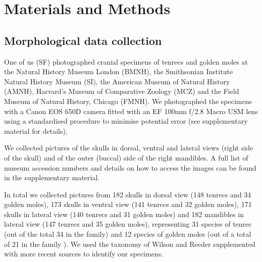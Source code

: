 \documentclass[12pt,a4paper]{article}
\begin{document}
\section{Materials and Methods}

\subsection{Morphological data collection} 

	
	One of us (SF) photographed cranial specimens of tenrecs and golden moles at the Natural History Museum London (BMNH), the Smithsonian Institute Natural History Museum (SI), the American Museum of Natural History (AMNH), Harvard's Museum of Comparative Zoology (MCZ) and the Field Museum of Natural History, Chicago (FMNH). We photographed the specimens with a Canon EOS 650D camera fitted with an EF 100mm f/2.8 Macro USM lens using a standardised procedure to minimise potential error (see supplementary material for details). 

	We collected pictures of the skulls in dorsal, ventral and lateral views (right side of the skull) and of the outer (buccal) side of the right mandibles. A full list of museum accession numbers and details on how to access the images can be found in the supplementary material.
	

	In total we collected pictures from 182 skulls in dorsal view (148 tenrecs and 34 golden moles), 173 skulls in ventral view (141 tenrecs and 32 golden moles), 171 skulls in lateral view (140 tenrecs and 31 golden moles) and 182 mandibles in lateral view (147 tenrecs and 35 golden moles), representing 31 species of tenrec (out of the total 34 in the family) and 12 species of golden moles (out of a total of 21 in the family \citep{Asher2010}). We used the taxonomy of Wilson and Reeder \citeyearpar{Wilson2005} supplemented with more recent sources \citep{IUCN2012, Olson2013} to identify our specimens. 
	
\end{document}
